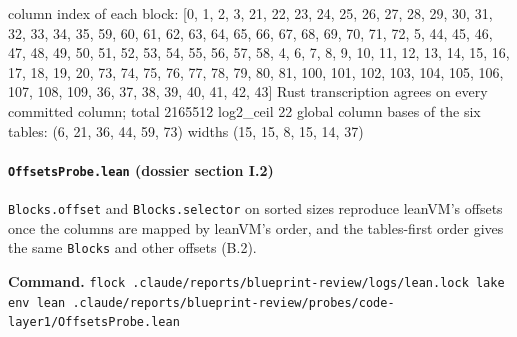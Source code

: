 \begin{srccode}
column index of each block: [0, 1, 2, 3, 21, 22, 23, 24, 25, 26, 27, 28, 29, 30, 31, 32, 33, 34, 35, 59, 60, 61, 62, 63, 64, 65, 66, 67, 68, 69, 70, 71, 72, 5, 44, 45, 46, 47, 48, 49, 50, 51, 52, 53, 54, 55, 56, 57, 58, 4, 6, 7, 8, 9, 10, 11, 12, 13, 14, 15, 16, 17, 18, 19, 20, 73, 74, 75, 76, 77, 78, 79, 80, 81, 100, 101, 102, 103, 104, 105, 106, 107, 108, 109, 36, 37, 38, 39, 40, 41, 42, 43]
Rust transcription agrees on every committed column; total 2165512 log2_ceil 22
global column bases of the six tables: (6, 21, 36, 44, 59, 73) widths (15, 15, 8, 15, 14, 37)
\end{srccode}

\paragraph{\texttt{OffsetsProbe.\allowbreak{}lean} (dossier section I.2)}\label{sec:gen-layer1-I2}

\texttt{Blocks.\allowbreak{}offset} and \texttt{Blocks.\allowbreak{}selector} on sorted sizes reproduce leanVM's offsets once the columns are mapped by leanVM's order, and the tables-first order gives the same \texttt{Blocks} and other offsets (B.2).

\textbf{Command.} \texttt{f\allowbreak{}l\allowbreak{}o\allowbreak{}c\allowbreak{}k\allowbreak{} .\allowbreak{}c\allowbreak{}l\allowbreak{}a\allowbreak{}u\allowbreak{}d\allowbreak{}e\allowbreak{}/\allowbreak{}r\allowbreak{}e\allowbreak{}p\allowbreak{}o\allowbreak{}r\allowbreak{}t\allowbreak{}s\allowbreak{}/\allowbreak{}b\allowbreak{}l\allowbreak{}u\allowbreak{}e\allowbreak{}p\allowbreak{}r\allowbreak{}i\allowbreak{}n\allowbreak{}t\allowbreak{}-{}\allowbreak{}r\allowbreak{}e\allowbreak{}v\allowbreak{}i\allowbreak{}e\allowbreak{}w\allowbreak{}/\allowbreak{}l\allowbreak{}o\allowbreak{}g\allowbreak{}s\allowbreak{}/\allowbreak{}l\allowbreak{}e\allowbreak{}a\allowbreak{}n\allowbreak{}.\allowbreak{}l\allowbreak{}o\allowbreak{}c\allowbreak{}k\allowbreak{} l\allowbreak{}a\allowbreak{}k\allowbreak{}e\allowbreak{} e\allowbreak{}n\allowbreak{}v\allowbreak{} l\allowbreak{}e\allowbreak{}a\allowbreak{}n\allowbreak{} .\allowbreak{}c\allowbreak{}l\allowbreak{}a\allowbreak{}u\allowbreak{}d\allowbreak{}e\allowbreak{}/\allowbreak{}r\allowbreak{}e\allowbreak{}p\allowbreak{}o\allowbreak{}r\allowbreak{}t\allowbreak{}s\allowbreak{}/\allowbreak{}b\allowbreak{}l\allowbreak{}u\allowbreak{}e\allowbreak{}p\allowbreak{}r\allowbreak{}i\allowbreak{}n\allowbreak{}t\allowbreak{}-{}\allowbreak{}r\allowbreak{}e\allowbreak{}v\allowbreak{}i\allowbreak{}e\allowbreak{}w\allowbreak{}/\allowbreak{}p\allowbreak{}r\allowbreak{}o\allowbreak{}b\allowbreak{}e\allowbreak{}s\allowbreak{}/\allowbreak{}c\allowbreak{}o\allowbreak{}d\allowbreak{}e\allowbreak{}-{}\allowbreak{}l\allowbreak{}a\allowbreak{}y\allowbreak{}e\allowbreak{}r\allowbreak{}1\allowbreak{}/\allowbreak{}O\allowbreak{}f\allowbreak{}f\allowbreak{}s\allowbreak{}e\allowbreak{}t\allowbreak{}s\allowbreak{}P\allowbreak{}r\allowbreak{}o\allowbreak{}b\allowbreak{}e\allowbreak{}.\allowbreak{}l\allowbreak{}e\allowbreak{}a\allowbreak{}n}

